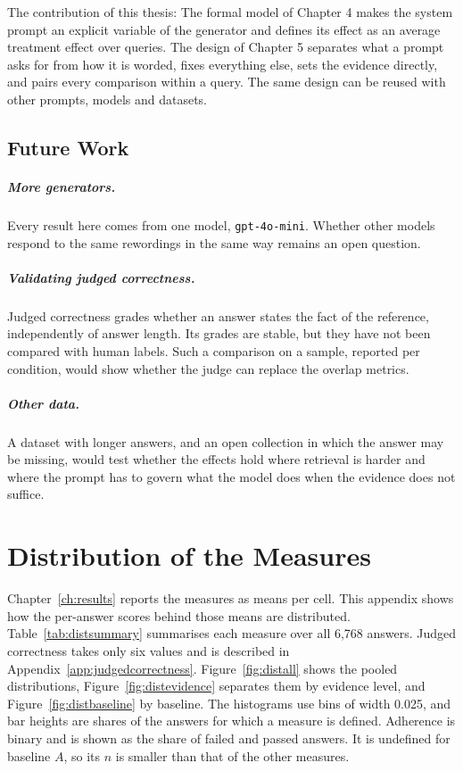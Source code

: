 \documentclass[12pt,a4paper,oneside]{scrreprt}
\begin{document}
The contribution of this thesis: The formal model of Chapter 4 makes the system prompt an explicit variable of the generator and defines its effect as an average treatment effect over queries. The design of Chapter 5 separates what a prompt asks for from how it is worded, fixes everything else, sets the evidence directly, and pairs every comparison within a query. The same design can be reused with other prompts, models and datasets.

\section{Future Work}
 

\paragraph{More generators.} Every result here comes from one model, \texttt{gpt-4o-mini}. Whether other models respond to the same rewordings in the same way remains an open question. 

\paragraph{Validating judged correctness.} Judged correctness grades whether an answer states the fact of the reference, independently of answer length. Its grades are stable, but they have not been compared with human labels. Such a comparison on a sample, reported per condition, would show whether the judge can replace the overlap metrics.

\paragraph{Other data.}  A dataset with longer answers, and an open collection in which the answer may be missing, would test whether the effects hold where retrieval is harder and where the prompt has to govern what the model does when the evidence does not suffice.

\appendix

\chapter{Distribution of the Measures}
\label{app:distributions}

Chapter~\ref{ch:results} reports the measures as means per cell. This appendix shows how the per-answer scores behind those means are distributed. Table~\ref{tab:distsummary} summarises each measure over all 6,768 answers. Judged correctness takes only six values and is described in Appendix~\ref{app:judgedcorrectness}. Figure~\ref{fig:distall} shows the pooled distributions, Figure~\ref{fig:distevidence} separates them by evidence level, and Figure~\ref{fig:distbaseline} by baseline. The histograms use bins of width 0.025, and bar heights are shares of the answers for which a measure is defined. Adherence is binary and is shown as the share of failed and passed answers. It is undefined for baseline $A$, so its $n$ is smaller than that of the other measures.
\end{document}

